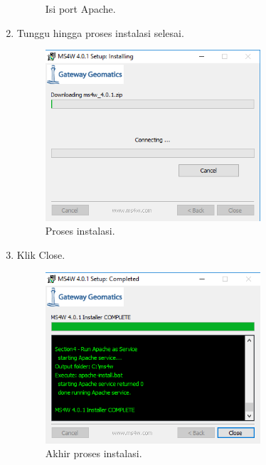 \begin{enumerate}
\begin{figure}[H]
		\centering
		\caption{Isi port Apache.}
	\end{figure}
	\item  Tunggu hingga proses instalasi selesai.
	\hfill\break
	\begin{figure}[H]
		\includegraphics[width=8cm]{figures/Tugas4/1174077/7.png}
		\centering
		\caption{Proses instalasi.}
	\end{figure}
	\item  Klik Close.
	\hfill\break
	\begin{figure}[H]
		\includegraphics[width=8cm]{figures/Tugas4/1174077/8.png}
		\centering
		\caption{Akhir proses instalasi.}
	\end{figure}
\end{enumerate}
